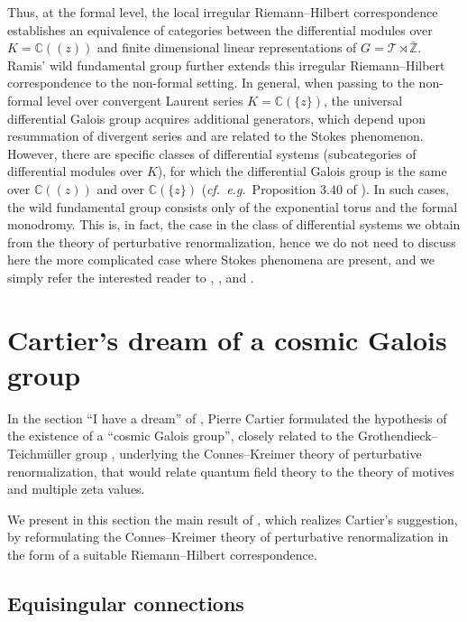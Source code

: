 \documentclass[10pt]{amsart}
\def\C{{\mathbb C}}
\def\Z{{\mathbb Z}}
\newcommand{\eg}{{\it e.g.\/}\ }
\newcommand{\cf}{{\it cf.\/}\ }
\numberwithin{equation}{section}
\begin{document}
Thus, at the formal level, the local irregular Riemann--Hilbert
correspondence establishes an equivalence of categories between
the differential modules over $K=\C((z))$ and finite dimensional
linear representations of $G={\mathcal T}\rtimes \bar\Z$. Ramis'
wild fundamental group \cite{MR} further extends this irregular
Riemann--Hilbert correspondence to the non-formal setting. In
general, when passing to the non-formal level over convergent
Laurent series $K=\C(\{z\})$, the universal differential Galois
group acquires additional generators, which depend upon
resummation of divergent series and are related to the Stokes
phenomenon. However, there are specific classes of differential
systems (subcategories of differential modules over $K$), for
which the differential Galois group is the same over $\C((z))$ and
over $\C(\{z\})$ (\cf \eg Proposition 3.40 of \cite{vPS}). In such
cases, the wild fundamental group consists only of the exponential
torus and the formal monodromy. This is, in fact, the case in the
class of differential systems we obtain from the theory of
perturbative renormalization, hence we do not need to discuss here
the more complicated case where Stokes phenomena are present, and
we simply refer the interested reader to \cite{MR}, \cite{vPS},
and \cite{vP}.



\section{Cartier's dream of a cosmic Galois group}\label{GalSect}

In the section ``I have a dream'' of \cite{Cart}, Pierre Cartier
formulated the hypothesis of the existence of a ``cosmic Galois
group'', closely related to the Grothendieck--Teichm\"uller group
\cite{Gro2}, underlying the Connes--Kreimer theory of perturbative
renormalization, that would relate quantum field theory to the theory
of motives and multiple zeta values.

\smallskip

We present in this section the main result of \cite{cmln}, which
realizes Cartier's suggestion, by reformulating the Connes--Kreimer
theory of perturbative renormalization in the form of a suitable
Riemann--Hilbert correspondence.

\subsection*{Equisingular connections}\hfill\medskip
\end{document}

